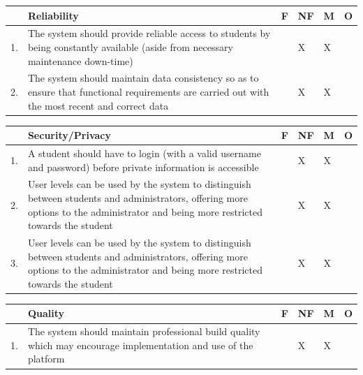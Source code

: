 \documentclass{article}
\begin{document}
\begin{center}
\begin{tabular}{|m{1cm}|m{10cm}|m{1cm}|m{1cm}|m{1cm}|m{1cm}|} 
\hline
 & \textbf{Reliability} & \textbf{F} & \textbf{NF} & \textbf{M} & \textbf{O} \\
\hline
1. & {The system should provide reliable access to students by being constantly available (aside from necessary maintenance down-time)} & & X & X & \\
\hline
2. & {The system should maintain data consistency so as to ensure that functional requirements are carried out with the most recent and correct data} & & X & X & \\
\hline
\end{tabular}
\end{center}

\begin{center}
\begin{tabular}{|m{1cm}|m{10cm}|m{1cm}|m{1cm}|m{1cm}|m{1cm}|} 
\hline
 & \textbf{Security/Privacy} & \textbf{F} & \textbf{NF} & \textbf{M} & \textbf{O} \\
\hline
1. & {A student should have to login (with a valid username and password) before private information is accessible
} & & X & X & \\
\hline
2. & {User levels can be used by the system to distinguish between students and administrators, offering more options to the administrator and being more restricted towards the student} & & X & X & \\
\hline
3. & {User levels can be used by the system to distinguish between students and administrators, offering more options to the administrator and being more restricted towards the student} & & X & X & \\
\hline
\end{tabular}
\end{center}

\begin{center}
\begin{tabular}{|m{1cm}|m{10cm}|m{1cm}|m{1cm}|m{1cm}|m{1cm}|} 
\hline
 & \textbf{Quality} & \textbf{F} & \textbf{NF} & \textbf{M} & \textbf{O} \\
\hline
1. & {The system should maintain professional build quality which may encourage implementation and use of the platform} & & X & X & \\
\hline
\end{tabular}
\end{center}
\end{document}
